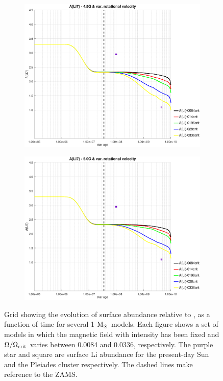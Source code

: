 \documentclass[fleqn,usenatbib]{mnras}
\begin{document}
\begin{figure}
    \begin{subfigure}[h]{0.47\textwidth}
    \includegraphics[trim = 35mm 15mm 20mm 15mm, clip,width=\textwidth]{figures/li_var_vel_4_5g.eps}
    \label{fig:subim5}
    \end{subfigure}
    \begin{subfigure}[h]{0.47\textwidth}
    \includegraphics[trim = 35mm 15mm 20mm 15mm, clip,width=\textwidth]{figures/li_var_vel_5_0g.eps}
    \label{fig:subim6}
    \end{subfigure}
\caption{Grid showing the evolution of surface  abundance relative to , as a function of time for several 1 $\mathrm{M}_\odot$ models. Each figure shows a set of models in which the magnetic field with intensity has been fixed and $\Omega / \Omega_{\mathrm{crit}}$ varies between 0.0084 and 0.0336, respectively. The purple star and square are surface Li abundance for the present-day Sun \citep{Asplund2009} and the Pleiades cluster \citep{Sestito2005} respectively. The dashed lines make reference to the ZAMS.}
\label{fig:grid_li_var_vel}
\end{figure}
\par
\end{document}
